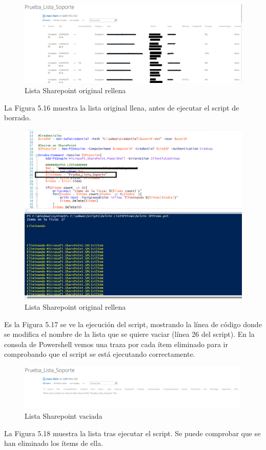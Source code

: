 \documentclass[a4paper, 12pt]{book}
\begin{document}
\begin{itemize}
\begin{figure}
	\centering
	\includegraphics[width=17cm, keepaspectratio]{img/image15.png}
	\caption{Lista Sharepoint original rellena}
	\label{fig:image15}
\end{figure}

La Figura 5.16 muestra la lista original llena, antes de ejecutar el script de borrado.

\begin{figure}
	\centering
	\includegraphics[width=17cm, keepaspectratio]{img/image16.png}
	\caption{Lista Sharepoint original rellena}
	\label{fig:image16}
\end{figure}

Es la Figura 5.17 se ve la ejecución del script, mostrando la línea de código donde se modifica el nombre de la lista que se quiere vaciar (línea 26 del script). En la consola de Powershell vemos una traza por cada ítem eliminado para ir comprobando que el script se está ejecutando correctamente.

\begin{figure}
	\centering
	\includegraphics[width=17cm, keepaspectratio]{img/image12.png}
	\caption{Lista Sharepoint vaciada}
	\label{fig:image12}
\end{figure}

La Figura 5.18 muestra la lista tras ejecutar el script. Se puede comprobar que se han eliminado los ítems de ella.

\end{itemize}
\end{document}
